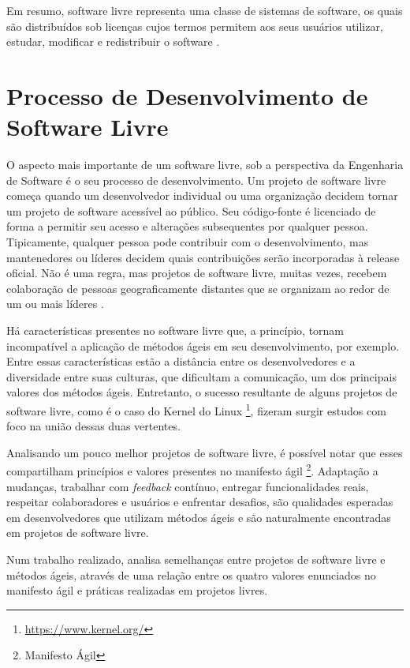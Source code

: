 Em resumo, software livre representa uma classe de sistemas de software, os quais são distribuídos sob licenças cujos termos permitem aos seus usuários utilizar, estudar, modificar e redistribuir o software \cite{terceiro2012freesoftware}. 

\section{Processo de Desenvolvimento de Software Livre}
\label{sec-proc-sl}

O aspecto mais importante de um software livre, sob a perspectiva da Engenharia de Software é o seu processo de desenvolvimento. Um projeto de software livre começa quando um desenvolvedor individual ou uma organização decidem tornar um projeto de software acessível ao público. Seu código-fonte é licenciado de forma a permitir seu acesso e alterações subsequentes por qualquer pessoa. Tipicamente, qualquer pessoa pode contribuir com o desenvolvimento, mas mantenedores ou líderes decidem quais contribuições serão incorporadas à release oficial. Não é uma regra, mas projetos de software livre, muitas vezes, recebem colaboração de pessoas geograficamente distantes que se organizam ao redor de um ou mais líderes \cite{corbucci2011freemethods}. 

Há características presentes no software livre que, a princípio, tornam incompatível a aplicação de métodos ágeis em seu desenvolvimento, por exemplo. Entre essas características estão a distância entre os desenvolvedores e a diversidade entre suas culturas, que dificultam a comunicação, um dos principais valores dos métodos ágeis. Entretanto, o sucesso resultante de alguns projetos de software livre, como é o caso do Kernel do Linux \footnote{\url{https://www.kernel.org/}}, fizeram surgir estudos com foco na união dessas duas vertentes.

Analisando um pouco melhor projetos de software livre, é possível notar que esses compartilham princípios e valores presentes no manifesto ágil \footnote{Manifesto Ágil}. Adaptação a mudanças, trabalhar com \textit{feedback} contínuo, entregar funcionalidades reais, respeitar colaboradores e usuários e enfrentar desafios, são qualidades esperadas em desenvolvedores que utilizam métodos ágeis e são naturalmente encontradas em projetos de software livre.

Num trabalho realizado,  analisa semelhanças entre projetos de software livre e métodos ágeis, através de uma relação entre os quatro valores enunciados no manifesto ágil e práticas realizadas em projetos livres. 


